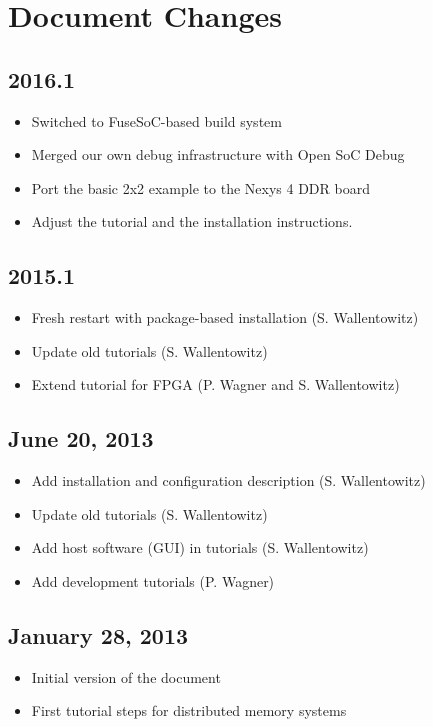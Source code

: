\section*{Document Changes}


\subsection*{2016.1}
\begin{itemize}
\item Switched to FuseSoC-based build system
\item Merged our own debug infrastructure with Open SoC Debug
\item Port the basic 2x2 example to the Nexys 4 DDR board
\item Adjust the tutorial and the installation instructions.
\end{itemize}

\subsection*{2015.1}
\begin{itemize}
\item Fresh restart with package-based installation (S. Wallentowitz)
\item Update old tutorials (S. Wallentowitz)
\item Extend tutorial for FPGA (P. Wagner and S. Wallentowitz)
\end{itemize}

\subsection*{June 20, 2013}
\begin{itemize}
\item Add installation and configuration description (S. Wallentowitz)
\item Update old tutorials (S. Wallentowitz)
\item Add host software (GUI) in tutorials (S. Wallentowitz)
\item Add development tutorials (P. Wagner)
\end{itemize}

\subsection*{January 28, 2013}
\begin{itemize}
\item Initial version of the document
\item First tutorial steps for distributed memory systems
\end{itemize}
